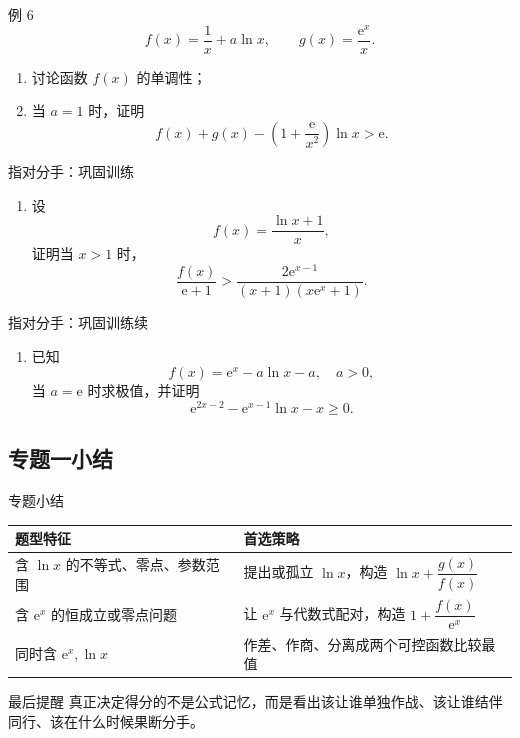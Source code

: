 ﻿\documentclass[aspectratio=169,11pt]{ctexbeamer}
\newcommand{\e}{\mathrm{e}}
\begin{document}
\begin{frame}{例 6}
\small
\[
f(x)=\frac1x+a\ln x,\qquad g(x)=\frac{\e^x}{x}.
\]
\begin{enumerate}
  \item 讨论函数 $f(x)$ 的单调性；
  \item 当 $a=1$ 时，证明
  \[
  f(x)+g(x)-\left(1+\frac{\e}{x^2}\right)\ln x>\e.
  \]
\end{enumerate}
\end{frame}

\begin{frame}{指对分手：巩固训练}
\small
\begin{enumerate}
  \item 设
  \[
  f(x)=\frac{\ln x+1}{x},
  \]
  证明当 $x>1$ 时，
  \[
  \frac{f(x)}{\e+1}>\frac{2\e^{x-1}}{(x+1)(x\e^x+1)}.
  \]
\end{enumerate}
\end{frame}

\begin{frame}{指对分手：巩固训练续}
\small
\begin{enumerate}
  \item[2.] 已知
  \[
  f(x)=\e^x-a\ln x-a,\quad a>0,
  \]
  当 $a=\e$ 时求极值，并证明
  \[
  \e^{2x-2}-\e^{x-1}\ln x-x\ge 0.
  \]
\end{enumerate}
\end{frame}

\subsection{专题一小结}

\begin{frame}{专题小结}
\small
\begin{center}
\renewcommand{\arraystretch}{1.35}
\begin{tabular}{>{\raggedright\arraybackslash}p{} >{\raggedright\arraybackslash}p{}}
\toprule
题型特征 & 首选策略 \\
\midrule
含 $\ln x$ 的不等式、零点、参数范围 & 提出或孤立 $\ln x$，构造 $\ln x+\dfrac{g(x)}{f(x)}$ \\
含 $\e^x$ 的恒成立或零点问题 & 让 $\e^x$ 与代数式配对，构造 $1+\dfrac{f(x)}{\e^x}$ \\
同时含 $\e^x,\ln x$ & 作差、作商、分离成两个可控函数比较最值 \\
\bottomrule
\end{tabular}
\end{center}

\begin{alertblock}{最后提醒}
真正决定得分的不是公式记忆，而是看出\alert{该让谁单独作战、该让谁结伴同行、该在什么时候果断分手}。
\end{alertblock}
\end{frame}
\end{document}

